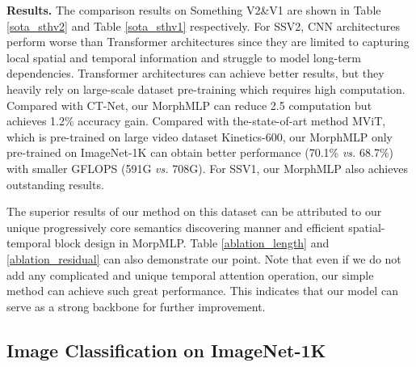 \documentclass[runningheads]{llncs}
\begin{document}
\noindent
\textbf{Results.} The comparison results on Something V2\&V1 are  shown in Table \ref{sota_sthv2} and Table \ref{sota_sthv1}  respectively. For SSV2, CNN  architectures perform worse than Transformer architectures since they are limited to capturing local spatial and temporal information and struggle to model long-term dependencies. Transformer architectures can achieve better results, but they heavily rely on large-scale dataset pre-training which requires high computation. Compared with CT-Net\cite{ct_net}, our MorphMLP can reduce 2.5 computation but achieves 1.2\% accuracy gain.   Compared with the-state-of-art method MViT\cite{mvit}, which is pre-trained on large video dataset Kinetics-600, our MorphMLP only pre-trained on  ImageNet-1K can obtain better performance (70.1\% \textit{vs.}  68.7\%) with smaller GFLOPS (591G \textit{vs.}  708G).  For SSV1, our MorphMLP also achieves outstanding results. 

The superior results of our method on this dataset can be attributed to our unique progressively  core semantics discovering manner and efficient spatial-temporal block design in MorpMLP. Table \ref{ablation_length} and \ref{ablation_residual} can also demonstrate our point. Note that even if we do not add any complicated and unique temporal attention operation, our simple method can achieve such great performance. This indicates that our model can serve as a strong backbone for further improvement. 





\subsection{Image Classification on ImageNet-1K}
\end{document}
